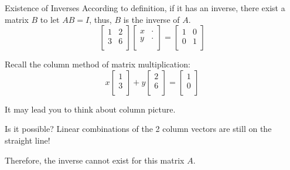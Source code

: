 \documentclass{beamer}
\begin{document}
\begin{frame}{Existence of Inverses}
According to definition, if it has an inverse, there exist a matrix $B$ to let $AB=I$, thus, $B$ is the inverse of $A$.
\begin{equation*}
    \left[ \begin{matrix}
        1&		2\\
        3&		6\\
    \end{matrix} \right] \left[ \begin{matrix}
        x&		\cdot\\
        y&		\cdot\\
    \end{matrix} \right] =\left[ \begin{matrix}
        1&		0\\
        0&		1\\
    \end{matrix} \right]
\end{equation*}

Recall the column method of matrix multiplication:
\begin{equation*}
    x\left[ \begin{array}{c}
        1\\
        3\\
    \end{array} \right] +y\left[ \begin{array}{c}
        2\\
        6\\
    \end{array} \right] =\left[ \begin{array}{c}
        1\\
        0\\
    \end{array} \right]
\end{equation*}

It may lead you to think about column picture.

\vspace{3pt}
Is it possible? Linear combinations of the 2 column vectors are still on the straight line!

\vspace{3pt}
Therefore, the inverse cannot exist for this matrix $A$.
\end{frame}
\end{document}
